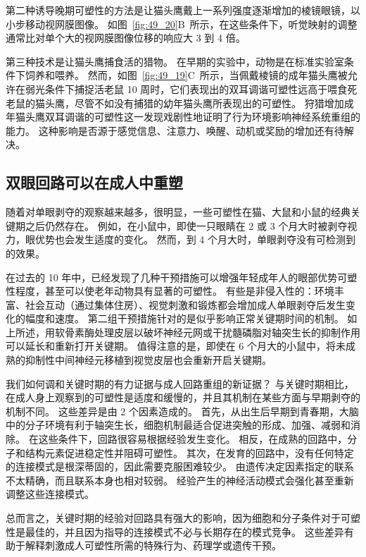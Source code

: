第二种诱导晚期可塑性的方法是让猫头鹰戴上一系列强度逐渐增加的棱镜眼镜，以小步移动视网膜图像。
如图~\ref{fig:49_20}B~所示，在这些条件下，听觉映射的调整通常比对单个大的视网膜图像位移的响应大 3 到 4 倍。

第三种技术是让猫头鹰捕食活的猎物。
在早期的实验中，动物是在标准实验室条件下饲养和喂养。
然而，如图~\ref{fig:49_19}C~所示，当佩戴棱镜的成年猫头鹰被允许在弱光条件下捕捉活老鼠 10 周时，它们表现出的双耳调谐可塑性远高于喂食死老鼠的猫头鹰，尽管不如没有捕猎的幼年猫头鹰所表现出的可塑性。
狩猎增加成年猫头鹰双耳调谐的可塑性这一发现戏剧性地证明了行为环境影响神经系统重组的能力。
这种影响是否源于感觉信息、注意力、唤醒、动机或奖励的增加还有待解决。



\subsection{双眼回路可以在成人中重塑}

随着对单眼剥夺的观察越来越多，很明显，一些可塑性在猫、大鼠和小鼠的经典关键期之后仍然存在。
例如，在小鼠中，即使一只眼睛在 2 或 3 个月大时被剥夺视力，眼优势也会发生适度的变化。
然而，到 4 个月大时，单眼剥夺没有可检测到的效果。


在过去的 10 年中，已经发现了几种干预措施可以增强年轻成年人的眼部优势可塑性程度，甚至可以使老年动物具有显著的可塑性。
有些是非侵入性的：环境丰富、社会互动（通过集体住房）、视觉刺激和锻炼都会增加成人单眼剥夺后发生变化的幅度和速度。
第二组干预措施针对的是似乎影响正常关键期时间的机制。
如上所述，用软骨素酶处理皮层以破坏神经元网或干扰髓磷脂对轴突生长的抑制作用可以延长和重新打开关键期。
值得注意的是，即使在 6 个月大的小鼠中，将未成熟的抑制性中间神经元移植到视觉皮层也会重新开启关键期。


我们如何调和关键时期的有力证据与成人回路重组的新证据？
与关键时期相比，在成人身上观察到的可塑性是适度和缓慢的，并且其机制在某些方面与早期剥夺的机制不同。
这些差异是由 2 个因素造成的。
首先，从出生后早期到青春期，大脑中的分子环境有利于轴突生长，细胞机制最适合促进突触的形成、加强、减弱和消除。
在这些条件下，回路很容易根据经验发生变化。
相反，在成熟的回路中，分子和结构元素促进稳定性并阻碍可塑性。
其次，在发育的回路中，没有任何特定的连接模式是根深蒂固的，因此需要克服困难较少。
由遗传决定因素指定的联系不太精确，而且联系本身也相对较弱。
经验产生的神经活动模式会强化甚至重新调整这些连接模式。


总而言之，关键时期的经验对回路具有强大的影响，因为细胞和分子条件对于可塑性是最佳的，并且因为指导的连接模式不必与长期存在的模式竞争。
这些差异有助于解释刺激成人可塑性所需的特殊行为、药理学或遗传干预。



